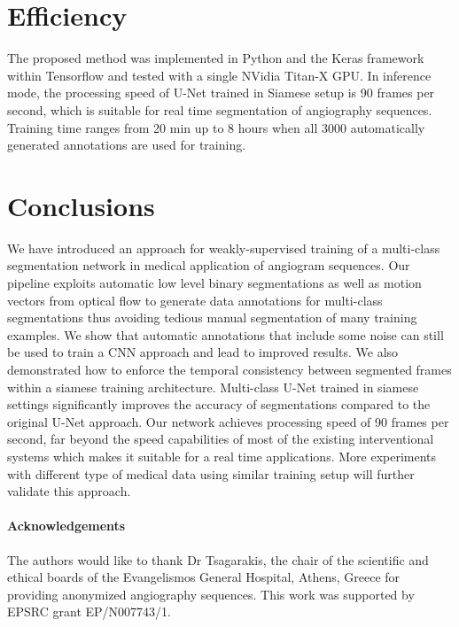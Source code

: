 \documentclass{bmvc2k}
\begin{document}
\section{Efficiency}
The proposed method was implemented in Python and the Keras framework within Tensorflow and tested with a single NVidia Titan-X GPU. In inference mode, the processing speed of U-Net trained in Siamese setup is 90 frames per second, which is suitable for real time segmentation of angiography sequences. Training time ranges from 20 min up to 8 hours when all 3000 automatically generated annotations are used for training.

\section{Conclusions}
We have introduced an approach for weakly-supervised training of a multi-class segmentation network in medical application of angiogram sequences. Our pipeline exploits automatic low level binary segmentations as well as motion vectors from optical flow to generate data annotations for multi-class segmentations thus avoiding tedious  manual segmentation of many training examples. We show that automatic annotations that include some noise can still be used to train a CNN approach and lead to improved results. We also demonstrated how to enforce the temporal consistency between segmented frames within a siamese training architecture. Multi-class U-Net trained in siamese settings   significantly improves the accuracy of segmentations compared to the original U-Net approach. Our network achieves processing speed of 90 frames per second, far beyond the speed capabilities of most of the existing interventional systems which makes it suitable for a real time applications. More experiments with different type of medical data using similar training setup will further validate this approach.
\paragraph{Acknowledgements}
The authors would like to thank Dr Tsagarakis, the chair of the scientific and ethical boards of the Evangelismos General Hospital, Athens, Greece for providing anonymized angiography sequences. 
This work was supported by EPSRC grant EP/N007743/1.%


\end{document}
